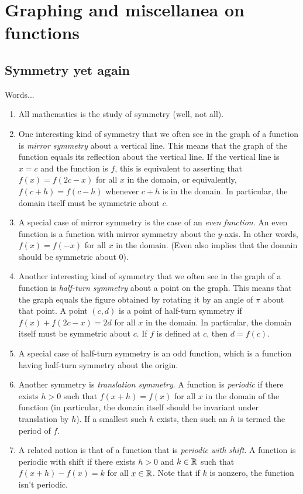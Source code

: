 \documentclass[10pt]{amsart}
\begin{document}
\section{Graphing and miscellanea on functions}

\subsection{Symmetry yet again}

Words...

\begin{enumerate}
\item All mathematics is the study of symmetry (well, not all).
\item One interesting kind of symmetry that we often see in the graph
  of a function is {\em mirror symmetry} about a vertical line. This
  means that the graph of the function equals its reflection about the
  vertical line. If the vertical line is $x = c$ and the function is
  $f$, this is equivalent to asserting that $f(x) = f(2c - x)$ for all
  $x$ in the domain, or equivalently, $f(c + h) = f(c - h)$ whenever
  $c + h$ is in the domain. In particular, the domain itself must be
  symmetric about $c$.
\item A special case of mirror symmetry is the case of an {\em even
  function}. An even function is a function with mirror symmetry about
  the $y$-axis. In other words, $f(x) = f(-x)$ for all $x$ in the
  domain. (Even also implies that the domain should be symmetric about $0$).
\item Another interesting kind of symmetry that we often see in the
  graph of a function is {\em half-turn symmetry} about a point on the
  graph. This means that the graph equals the figure obtained by
  rotating it by an angle of $\pi$ about that point. A point $(c,d)$
  is a point of half-turn symmetry if $f(x) + f(2c - x) = 2d$ for all
  $x$ in the domain. In particular, the domain itself must be
  symmetric about $c$. If $f$ is defined at $c$, then $d = f(c)$.
\item A special case of half-turn symmetry is an odd function, which
  is a function having half-turn symmetry about the origin.
\item Another symmetry is {\em translation symmetry}. A function is
  {\em periodic} if there exists $h > 0$ such that $f(x + h) = f(x)$
  for all $x$ in the domain of the function (in particular, the domain
  itself should be invariant under translation by $h$). If a smallest
  such $h$ exists, then such an $h$ is termed the period of $f$.
\item A related notion is that of a function that is {\em periodic
  with shift}. A function is periodic with shift if there exists $h >
  0$ and $k \in \mathbb{R}$ such that $f(x + h) - f(x) = k$ for all $x \in
  \mathbb{R}$. Note that if $k$ is nonzero, the function isn't periodic.


\end{enumerate}
\end{document}
